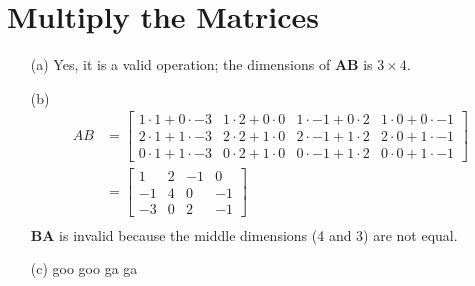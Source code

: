 \documentclass[10pt,a4paper]{article}
\begin{document}
\section{Multiply the Matrices}
\begin{itemize}
  \item[(a)] Yes, it is a valid operation; the dimensions of \textbf{AB} is $3 \times 4$.

  \item[(b)]
    \begin{align*}
      AB &=
        \begin{bmatrix}
          1 \cdot 1 + 0 \cdot -3 & 1 \cdot 2 + 0 \cdot 0 & 1 \cdot -1 + 0 \cdot 2 & 1 \cdot 0 + 0 \cdot -1 \\
          2 \cdot 1 + 1 \cdot -3 & 2 \cdot 2 + 1 \cdot 0 & 2 \cdot -1 + 1 \cdot 2 & 2 \cdot 0 + 1 \cdot -1 \\
          0\cdot 1 + 1\cdot -3 & 0\cdot 2 + 1\cdot 0 & 0\cdot -1 + 1\cdot 2 & 0\cdot 0 + 1\cdot -1
        \end{bmatrix} \\
        &=
        \begin{bmatrix}
          1 & 2 & -1 & 0 \\
          -1 & 4 & 0 & -1 \\
          -3 & 0 & 2 & -1
        \end{bmatrix} \\
    \end{align*}
    \textbf{BA} is invalid because the middle dimensions (4 and 3) are not equal.

  \item[(c)] goo goo ga ga
\end{itemize}
\end{document}

